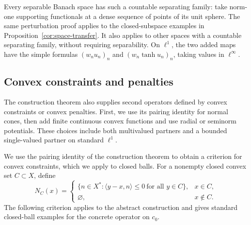 \documentclass[11pt]{article}
\newcommand{\pair}[2]{\langle #1,#2\rangle}
\theoremstyle{definition}
\theoremstyle{remark}
\begin{document}
Every separable Banach space has such a countable separating family: take norm-one supporting functionals at a dense sequence of points of its unit sphere. The same perturbation proof applies to the closed-subspace examples in Proposition~\ref{cor:space-transfer}. It also applies to other spaces with a countable separating family, without requiring separability. On $\ell^1$, the two added maps have the simple formulas $(w_nu_n)_n$ and $(w_n\tanh u_n)_n$, taking values in $\ell^\infty$.

\subsection{Convex constraints and penalties}
\label{subsec:convex-partners}

The construction theorem also supplies second operators defined by convex constraints or convex penalties. First, we use its pairing identity for normal cones, then add finite continuous convex functions and use radial or seminorm potentials. These choices include both multivalued partners and a bounded single-valued partner on standard $\ell^1$.

We use the pairing identity of the construction theorem to obtain a criterion for convex constraints, which we apply to closed balls. For a nonempty closed convex set $C\subset X$, define
\[
N_C(x)=
\begin{cases}
\{n\in X^*:\pair{y-x}{n}\le0\ \text{for all }y\in C\},&x\in C,\\
\varnothing,&x\notin C.
\end{cases}
\]
The following criterion applies to the abstract construction and gives standard closed-ball examples for the concrete operator on $c_0$.
\end{document}
